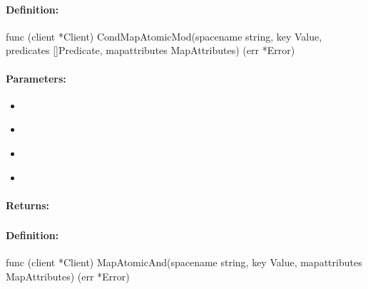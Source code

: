 \paragraph{Definition:}
\begin{gocode}
func (client *Client) CondMapAtomicMod(spacename string, key Value, predicates []Predicate, mapattributes MapAttributes) (err *Error)
\end{gocode}

\paragraph{Parameters:}
\begin{itemize}[noitemsep]
\item {}\\

\item {}\\

\item {}\\

\item {}\\

\end{itemize}

\paragraph{Returns:}


\pagebreak
\subsubsection{}
\label{api:Go:MapAtomicAnd}


\paragraph{Definition:}
\begin{gocode}
func (client *Client) MapAtomicAnd(spacename string, key Value, mapattributes MapAttributes) (err *Error)
\end{gocode}

